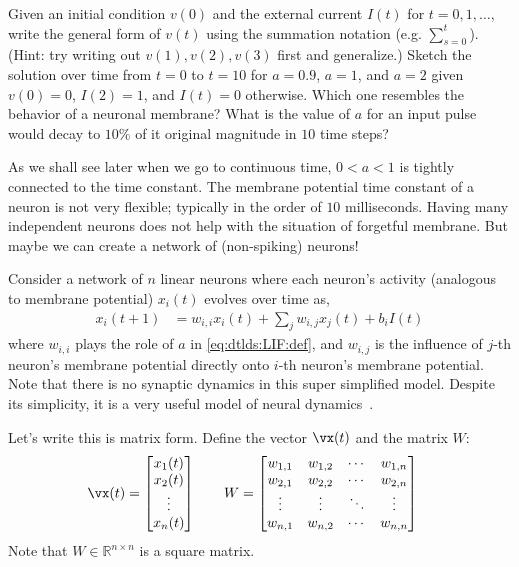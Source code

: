 \documentclass[a4paper,11pt]{exam}
\newcounter{ct}
\newcommand{\field}[1]{\ensuremath{\mathbb{#1}}}
\newcommand{\reals}{\field{R}}
\begin{document}
\begin{questions}
\question Given an initial condition $v(0)$ and the external current $I(t)$ for $t = 0, 1, \ldots $, write the general form of $v(t)$ using the summation notation (e.g. $\sum_{s=0}^t$). (Hint: try writing out $v(1), v(2), v(3)$ first and generalize.)
\question Sketch the solution over time from $t=0$ to $t=10$ for $a = 0.9$, $a = 1$, and $a = 2$ given $v(0) = 0$, $I(2) = 1$, and $I(t) = 0$ otherwise. Which one resembles the behavior of a neuronal membrane?
\question What is the value of $a$ for an input pulse would decay to $10\%$ of it original magnitude in $10$ time steps?

\newpage
As we shall see later when we go to continuous time, $0 < a < 1$ is tightly connected to the time constant.
The membrane potential time constant of a neuron is not very flexible; typically in the order of $10$ milliseconds.
Having many independent neurons does not help with the situation of forgetful membrane.
But maybe we can create a network of (non-spiking) neurons!

Consider a network of $n$ linear neurons where each neuron's activity (analogous to membrane potential) $x_i(t)$ evolves over time as,
\begin{align}\label{eq:dtlds:LDS}
	x_i(t+1) &= w_{i,i} x_i(t) + \sum_{j} w_{i,j} x_j(t) + b_i I(t)
\end{align}
where $w_{i,i}$ plays the role of $a$ in \eqref{eq:dtlds:LIF:def}, and $w_{i,j}$ is the influence of $j$-th neuron's membrane potential directly onto $i$-th neuron's membrane potential.
Note that there is no synaptic dynamics in this super simplified model.
Despite its simplicity, it is a very useful model of neural dynamics~\citep{Druckmann2012,Ganguli2008,Goldman2009}.

Let's write this is matrix form. Define the vector $\vx(t)$ and the matrix $W$:
\begin{align}
	\vx(t) &= 
	    \begin{bmatrix}
		x_1(t)\\
		x_2(t)\\
		\vdots\\
		x_n(t)
	    \end{bmatrix}
	\qquad
	W =
	    \begin{bmatrix}
		w_{1,1} & w_{1,2} & \cdots & w_{1,n}
		\\
		w_{2,1} & w_{2,2} & \cdots & w_{2,n}
		\\
		\vdots & \vdots & \ddots & \vdots
		\\
		w_{n,1} & w_{n,2} & \cdots & w_{n,n}
	    \end{bmatrix}
\end{align}
Note that $W \in \reals^{n \times n}$ is a square matrix.


\end{questions}
\end{document}
